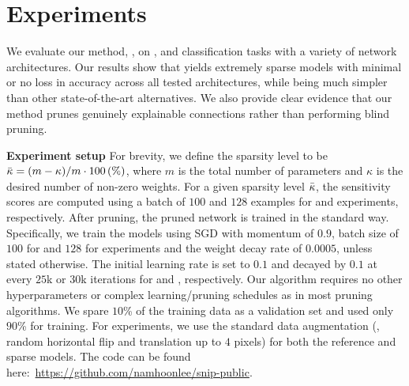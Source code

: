 \section{Experiments}

We evaluate our method, \snip{}, on \mnist{},  and \timagenet{} classification tasks with a variety of network architectures.
Our results show that \snip{} yields extremely sparse models with minimal or no loss in accuracy across all tested architectures, while being much simpler than other state-of-the-art alternatives.
We also provide clear evidence that our method prunes genuinely explainable connections rather than performing blind pruning.

\textbf{Experiment setup}\quad
For brevity, we define the sparsity level to be $\bar{\kappa} = (m-\kappa)/m\cdot 100\,(\%)$, where $m$ is the total number of parameters and $\kappa$ is the desired number of non-zero weights.
For a given sparsity level $\bar{\kappa}$, the sensitivity scores are computed using a batch of $100$ and $128$ examples for \mnist{} and \cifar{} experiments, respectively.
After pruning, the pruned network is trained in the standard way.
Specifically, we train the models using SGD with momentum of $0.9$, batch size of $100$ for \mnist{} and $128$ for \cifar{} experiments and the weight decay rate of $0.0005$, unless stated otherwise.
The initial learning rate is set to $0.1$ and decayed by $0.1$ at every $25$k or $30$k iterations for \mnist{} and \cifar{}, respectively.
Our algorithm requires no other hyperparameters or complex learning/pruning schedules as in most pruning algorithms.
We spare $10$\% of the training data as a validation set and used only $90$\% for training.
For \cifar{} experiments, we use the standard data augmentation (\ie, random horizontal flip and translation up to $4$ pixels) for both the reference and sparse models.
The code can be found here:~\href{https://github.com/namhoonlee/snip-public}{https://github.com/namhoonlee/snip-public}.

